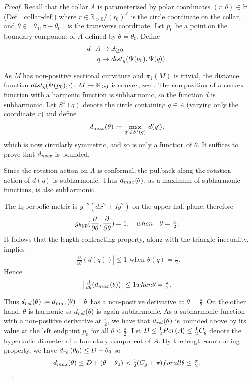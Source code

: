 \documentclass[10pt,letterpaper,english,reqno]{amsart}
\numberwithin{equation}{subsection}
\newcommand\bH{{\mathbb H}}
\newcommand\R{{\mathbb R}}
\newcommand\Z{{\mathbb Z}}
\theoremstyle{definition}
\begin{document}
\begin{proof}
Recall that the collar $A$ is parameterized
by polar coordinates $(r,\theta)\in \bH$ (Def.~\ref{collar-def}) where $r\in \R_{>0}/(r_0)^\Z$ is the circle coordinate on the collar, and $\theta\in [\theta_0,\pi-\theta_0]$ is the transverse
coordinate. Let $p_0$ be a point on the boundary component
of $A$ defined by $\theta=\theta_0$.
Define \begin{align*} d\colon A 
&\to \R_{\geq 0} \\
q&\mapsto {\rm dist}_g(\Psi(p_0),\Psi(q)).\end{align*}

As $M$ has non-positive sectional curvature and
$\pi_1(M)$ is trivial, the distance function
${\rm dist}_g(\Psi(p_0),\cdot)\colon M\to \R_{\geq 0}$ is convex, see \cite[Corollary 4.8.2]{jost}. The 
composition of a convex function with a harmonic function
is subharmonic, so the function
$d$ is subharmonic. Let $S^1(q)$ denote the 
circle containing $q\in A$ (varying
only the coordinate $r$) and
define $$d_{\rm max}(\theta):=\max_{q'\in S^1(q)} \,d(q'),$$
which is now circularly symmetric, and so
is only a function of $\theta$.
It suffices to
prove that $d_{\rm max}$ is bounded.

Since the rotation action on $A$ is conformal,
the pullback along the rotation action of $d(q)$ is
subharmonic. Thus $d_{\rm max}(\theta)$, as a maximum of
subharmonic functions, is also subharmonic. 


The hyperbolic metric is $y^{-2}(dx^2+dy^2)$
on the upper half-plane, therefore \[g_{\rm hyp}(\frac{\partial}{\partial \theta}, \frac{\partial}{\partial \theta})=1,\quad  \textrm{when}\quad  \theta = \tfrac{\pi}{2}.\]
It follows that the length-contracting property,
along with the triangle inequality, implies
\begin{align*} \left|\tfrac{\partial}{\partial\theta}(d(q))\right|\leq 1 \textrm{ when }\theta(q)=\tfrac{\pi}{2}.\end{align*}
Hence 
\begin{align*}
    \left|\tfrac{d}{d\theta}(d_{\rm max}(\theta))\right|\leq 1 \textrm{ when }\theta=\tfrac{\pi}{2}.
\end{align*}

Thus $d_{\rm rel}(\theta):=
d_{\rm max}(\theta)-\theta$ has a non-positive
derivative at $\theta=\tfrac{\pi}{2}$.
On the other hand, $\theta$ is harmonic so
$d_{\rm rel}(\theta)$ is again subharmonic.
As a subharmonic function with a non-positive derivative
at $\tfrac{\pi}{2}$, we have that
$d_{\rm rel}(\theta)$ is bounded above by its value
at the left endpoint $p_0$ for all $\theta\leq \tfrac{\pi}{2}$.
Let $D\leq \tfrac{1}{2}{\rm Per}(A)\leq \tfrac{1}{2}C_g$ denote the hyperbolic diameter of
a boundary component of $A$. By the length-contracting
property, we have $d_{\rm rel}(\theta_0)\leq D-\theta_0$ so
$$d_{\rm max}(\theta)\leq D+ (\theta-\theta_0)<\tfrac{1}{2}(C_g+ \pi)\textrm{ for all }\theta\leq \tfrac{\pi}{2}.$$


\end{proof}
\end{document}
